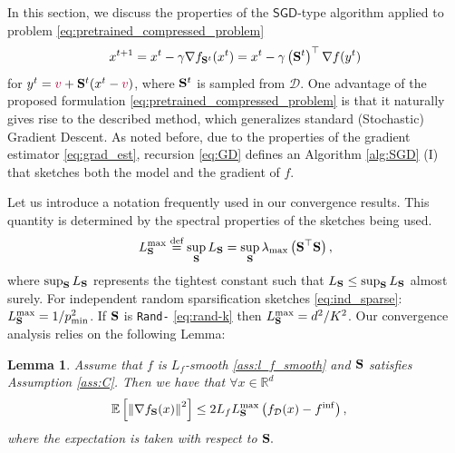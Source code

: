 \documentclass{article}
\newcommand{\rnd}[1]{{\texttt{Rand-}}#1}
\newcommand{\shift}{{\color{purple}s}}
\newcommand{\SGD}{$\mathsf{SGD}$}
\newcommand{\bb}{\mathbb}
\newcommand{\cD}{\mathcal{D}}
\newcommand{\eqdef}{\stackrel{\text{def}}{=}}
\newcommand{\Exp}[1]{{\bb E}\left[#1\right]}
\newtheorem{lemma}{Lemma}
\theoremstyle{plain}
\newcommand{\tf}{f_{\mathcal{D}}}
\renewcommand{\shift}{{\color{purple}v}}
\newcommand{\mS}{{\bf S}}
\theoremstyle{plain}
\theoremstyle{definition}
\theoremstyle{remark}
\begin{document}
In this section, we discuss the properties of the \SGD-type algorithm applied to problem \eqref{eq:pretrained_compressed_problem}
\begin{equation}
	\label{eq:GD}
	x^{t+1} = x^t - \gamma \nabla f_{\mS^{t}} (x^t) = x^t - \gamma \left(\mS^{t}\right)^\top \nabla f(y^t)
\end{equation}
for $y^t = \shift + \mS^t (x^t - \shift)$, where $\mS^t$ is sampled from $\cD$.
One advantage of the proposed formulation \eqref{eq:pretrained_compressed_problem} is that it naturally gives rise to the described method, which generalizes standard (Stochastic) Gradient Descent.
As noted before, due to the properties of the gradient estimator \eqref{eq:grad_est}, recursion \eqref{eq:GD} defines an Algorithm \ref{alg:SGD} (I) that sketches both the model and the gradient of $f$.

Let us introduce a notation frequently used in our convergence results. This quantity is determined by the spectral properties of the sketches being used.
\begin{equation}
	L_{\mS}^{\max} \eqdef \sup_{\mS} L_{\mS} = \sup_{\mS} \lambda_{\max}\left(\mS^{\top}\mS\right),
\end{equation}
where $\sup_{\mS} L_{\mS}$ represents the tightest constant such that $L_{\mS} \leq \sup_{\mS} L_{\mS}$ almost surely.
%
For independent random sparsification sketches \eqref{eq:ind_sparse}:
$L_{\mS}^{\max} = 1 / p^2_{\min}$. If $\mS$ is \rnd{} \eqref{eq:rand-k} then $L_{\mS}^{\max} = d^2/K^2$. Our convergence analysis relies on the following Lemma:

\begin{lemma} \label{lemma:ac}
	Assume that $f$ is $L_f$-smooth \eqref{ass:l_f_smooth} and $\mS$ satisfies Assumption \ref{ass:C}. Then we have that $\forall x\in\mathbb{R}^d$
	\begin{equation*}
		\begin{split}
			\Exp{\left\|\nabla f_{\mS}(x)\right\|^2} & \leq 2L_f L_{\mS}^{\max} \left(\tf(x) - f^{\inf}\right),
		\end{split}
	\end{equation*}
	where the expectation is taken with respect to $\mS.$
\end{lemma}
\end{document}
